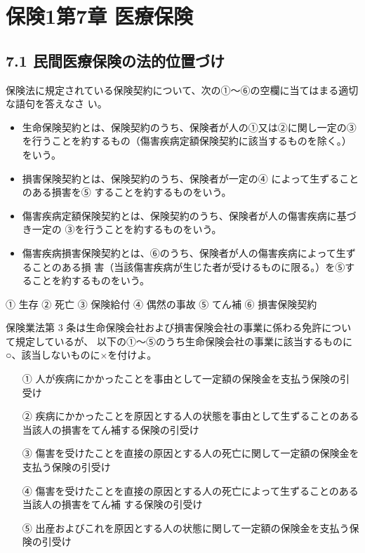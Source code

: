 \documentclass[report,gutter=10mm,fore-edge=10mm,uplatex,dvipdfmx]{jlreq}
\begin{document}
\chapter{保険1第7章 医療保険}
\section{7.1 民間医療保険の法的位置づけ}

保険法に規定されている保険契約について、次の①～⑥の空欄に当てはまる適切な語句を答えなさ
い。
\begin{itemize}
 \item 生命保険契約とは、保険契約のうち、保険者が人の①又は②に関し一定の③を行うことを約するもの（傷害疾病定額保険契約に該当するものを除く。）をいう。
 \item 損害保険契約とは、保険契約のうち、保険者が一定の④
によって生ずることのある損害を⑤
することを約するものをいう。
 \item 傷害疾病定額保険契約とは、保険契約のうち、保険者が人の傷害疾病に基づき一定の
③を行うことを約するものをいう。
 \item 傷害疾病損害保険契約とは、⑥のうち、保険者が人の傷害疾病によって生ずることのある損
害（当該傷害疾病が生じた者が受けるものに限る。）を⑤することを約するものをいう。
\end{itemize}


① 生存
② 死亡
③ 保険給付
④ 偶然の事故
⑤ てん補
⑥ 損害保険契約

保険業法第 3 条は生命保険会社および損害保険会社の事業に係わる免許について規定しているが、
以下の①～⑤のうち生命保険会社の事業に該当するものに○、該当しないものに×を付けよ。

\begin{itemize}
 \item [①] 人が疾病にかかったことを事由として一定額の保険金を支払う保険の引受け
 \item [②]
疾病にかかったことを原因とする人の状態を事由として生ずることのある当該人の損害をてん補する保険の引受け
 \item [③]
傷害を受けたことを直接の原因とする人の死亡に関して一定額の保険金を支払う保険の引受け
 \item [④]
傷害を受けたことを直接の原因とする人の死亡によって生ずることのある当該人の損害をてん補
する保険の引受け
 \item [⑤]
出産およびこれを原因とする人の状態に関して一定額の保険金を支払う保険の引受け
\end{itemize}
\end{document}

